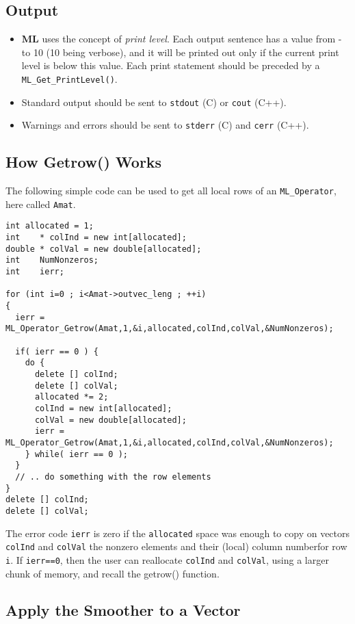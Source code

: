 \documentclass[10pt,letter,relax]{SANDreport}
\newcommand{\ML}     {{\bf ML }}
\begin{document}
\subsection{Output}

\begin{itemize}
\item \ML uses the concept of {\sl print level}. Each output sentence has a
  value from - to 10 (10 being verbose), and it will be printed out only if
  the current print level is below this value. Each print statement should be
  preceded by a \verb!ML_Get_PrintLevel()!.
\item Standard output should be sent to \verb!stdout! (C) or \verb!cout! (C++).
\item Warnings and errors should be sent to \verb!stderr! (C) and \verb!cerr!
(C++).
\end{itemize}

\subsection{How Getrow() Works}

The following simple code can be used to get all local rows of an
\verb!ML_Operator!, here called \verb!Amat!.
\begin{verbatim}
int allocated = 1;
int    * colInd = new int[allocated];
double * colVal = new double[allocated];
int    NumNonzeros;
int    ierr;

for (int i=0 ; i<Amat->outvec_leng ; ++i)
{
  ierr = ML_Operator_Getrow(Amat,1,&i,allocated,colInd,colVal,&NumNonzeros);

  if( ierr == 0 ) {
    do {
      delete [] colInd;
      delete [] colVal;
      allocated *= 2;
      colInd = new int[allocated];
      colVal = new double[allocated];
      ierr = ML_Operator_Getrow(Amat,1,&i,allocated,colInd,colVal,&NumNonzeros);
    } while( ierr == 0 );
  }
  // .. do something with the row elements
}
delete [] colInd;
delete [] colVal;
\end{verbatim}
The error code \verb!ierr! is zero if the \verb!allocated! space was enough to
copy on vectors \verb!colInd! and \verb!colVal! the nonzero elements and their
(local) column numberfor row \verb!i!. If \verb!ierr==0!, then the user can
reallocate \verb!colInd! and \verb!colVal!, using a larger chunk of memory,
  and recall the getrow() function.

\subsection{Apply the Smoother to a Vector}
\end{document}
